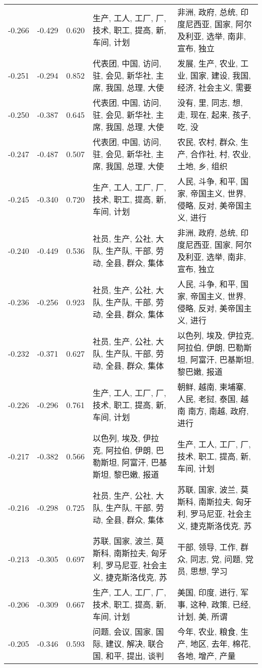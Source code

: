 \begin{tabular}{cccp{5cm}p{5cm}}
-0.266 & -0.429 & 0.620 & 生产, 工人, 工厂, 厂, 技术, 职工, 提高, 新, 车间, 计划 & 非洲, 政府, 总统, 印度尼西亚, 国家, 阿尔及利亚, 选举, 南非, 宣布, 独立 \\
-0.251 & -0.294 & 0.852 & 代表团, 中国, 访问, 驻, 会见, 新华社, 主席, 我国, 总理, 大使 & 发展, 生产, 农业, 工业, 国家, 建设, 我国, 经济, 社会主义, 需要 \\
-0.250 & -0.387 & 0.645 & 代表团, 中国, 访问, 驻, 会见, 新华社, 主席, 我国, 总理, 大使 & 没有, 里, 同志, 想, 走, 现在, 起来, 孩子, 吃, 没 \\
-0.247 & -0.487 & 0.507 & 代表团, 中国, 访问, 驻, 会见, 新华社, 主席, 我国, 总理, 大使 & 农民, 农村, 群众, 生产, 合作社, 村, 农业, 土地, 乡, 组织 \\
-0.245 & -0.340 & 0.720 & 生产, 工人, 工厂, 厂, 技术, 职工, 提高, 新, 车间, 计划 & 人民, 斗争, 和平, 国家, 帝国主义, 世界, 侵略, 反对, 美帝国主义, 进行 \\
-0.240 & -0.449 & 0.536 & 社员, 生产, 公社, 大队, 生产队, 干部, 劳动, 全县, 群众, 集体 & 非洲, 政府, 总统, 印度尼西亚, 国家, 阿尔及利亚, 选举, 南非, 宣布, 独立 \\
-0.236 & -0.256 & 0.923 & 社员, 生产, 公社, 大队, 生产队, 干部, 劳动, 全县, 群众, 集体 & 人民, 斗争, 和平, 国家, 帝国主义, 世界, 侵略, 反对, 美帝国主义, 进行 \\
-0.232 & -0.371 & 0.627 & 社员, 生产, 公社, 大队, 生产队, 干部, 劳动, 全县, 群众, 集体 & 以色列, 埃及, 伊拉克, 阿拉伯, 伊朗, 巴勒斯坦, 阿富汗, 巴基斯坦, 黎巴嫩, 报道 \\
-0.226 & -0.296 & 0.761 & 生产, 工人, 工厂, 厂, 技术, 职工, 提高, 新, 车间, 计划 & 朝鲜, 越南, 柬埔寨, 人民, 老挝, 泰国, 越南 南方, 南越, 政府, 进行 \\
-0.217 & -0.382 & 0.566 & 以色列, 埃及, 伊拉克, 阿拉伯, 伊朗, 巴勒斯坦, 阿富汗, 巴基斯坦, 黎巴嫩, 报道 & 生产, 工人, 工厂, 厂, 技术, 职工, 提高, 新, 车间, 计划 \\
-0.216 & -0.298 & 0.725 & 社员, 生产, 公社, 大队, 生产队, 干部, 劳动, 全县, 群众, 集体 & 苏联, 国家, 波兰, 莫斯科, 南斯拉夫, 匈牙利, 罗马尼亚, 社会主义, 捷克斯洛伐克, 苏 \\
-0.213 & -0.305 & 0.697 & 苏联, 国家, 波兰, 莫斯科, 南斯拉夫, 匈牙利, 罗马尼亚, 社会主义, 捷克斯洛伐克, 苏 & 干部, 领导, 工作, 群众, 同志, 党, 问题, 党员, 思想, 学习 \\
-0.206 & -0.309 & 0.667 & 生产, 工人, 工厂, 厂, 技术, 职工, 提高, 新, 车间, 计划 & 美国, 印度, 进行, 军事, 这种, 政策, 已经, 计划, 美, 所谓 \\
-0.205 & -0.346 & 0.593 & 问题, 会议, 国家, 国际, 建议, 解决, 联合国, 和平, 提出, 谈判 & 今年, 农业, 粮食, 生产, 地区, 去年, 棉花, 各地, 增产, 产量 \\

\end{tabular}
